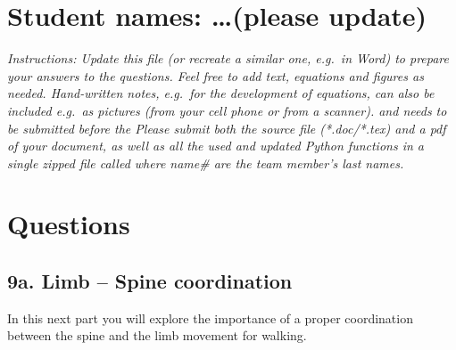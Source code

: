 \documentclass{cmc}
\begin{document}
\pagestyle{fancy}
 

\section*{Student names: \ldots (please update)}

\textit{Instructions: Update this file (or recreate a similar one, e.g.\ in
  Word) to prepare your answers to the questions. Feel free to add text,
  equations and figures as needed. Hand-written notes, e.g.\ for the development
  of equations, can also be included e.g.\ as pictures (from your cell phone or
  from a scanner).  \textbf{} and needs to be
  submitted before the \textbf{}  Please submit both the source file
  (*.doc/*.tex) and a pdf of your document, as well as all the used and updated
  Python functions in a single zipped file called
   where name\# are the team
  member’s last names.  }
\\

\section*{Questions}


\subsection*{9a. Limb – Spine coordination}
\label{sec:limb-spine-coordination}

In this next part you will explore the importance of a proper coordination
between the spine and the limb movement for walking.
\end{document}

